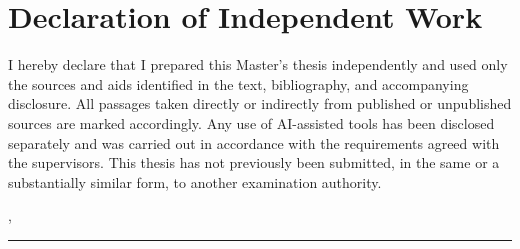 \chapter*{Declaration of Independent Work}

I hereby declare that I prepared this Master's thesis independently and used only the sources and aids identified in the text, bibliography, and accompanying disclosure. All passages taken directly or indirectly from published or unpublished sources are marked accordingly. Any use of AI-assisted tools has been disclosed separately and was carried out in accordance with the requirements agreed with the supervisors. This thesis has not previously been submitted, in the same or a substantially similar form, to another examination authority.

\vspace{2.0cm}

\noindent
\begin{minipage}[t]{0.47\textwidth}
\SubmissionPlace, \SubmissionDate
\end{minipage}
\hfill
\begin{minipage}[t]{0.47\textwidth}
\centering
\rule{0.9\linewidth}{0.4pt}\\
\ThesisAuthor
\end{minipage}

\cleardoublepage